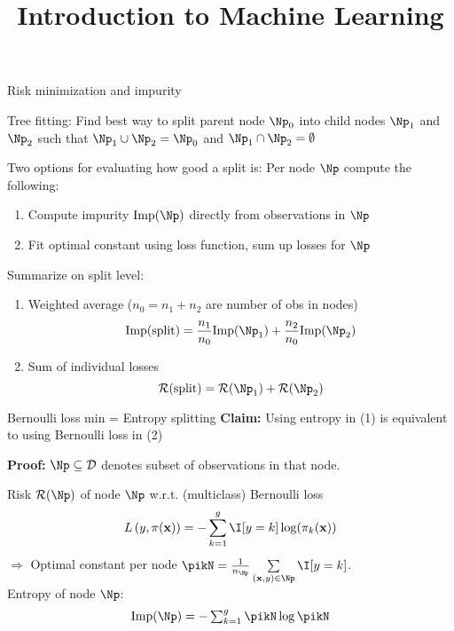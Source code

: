 \documentclass[11pt,compress,t,notes=noshow, xcolor=table]{beamer}
\title{Introduction to Machine Learning}
\begin{document}
    

\begin{framei}[sep=M]{Risk minimization and impurity}

\item Tree fitting: Find best way to split parent node $\Np_0$ into child nodes $\Np_1$ and $\Np_2$ such that $\Np_1 \cup \Np_2 = \Np_0$ and $\Np_1 \cap \Np_2 = \emptyset$
\item Two options for evaluating how good a split is: Per node $\Np$ compute the following:
\begin{enumerate}
\item Compute impurity $\text{Imp}(\Np)$ directly from observations in $\Np$
\item Fit optimal constant using loss function, sum up losses for $\Np$
\end{enumerate}
\item Summarize on split level:
\begin{enumerate}
\item Weighted average ($n_0 = n_1 + n_2$ are number of obs in nodes)
$$\text{Imp(split)} = \frac{n_1}{n_0} \text{Imp}(\Np_1) + \frac{n_2}{n_0} \text{Imp}(\Np_2)$$
\item Sum of individual losses
$$\risk(\text{split}) = \risk(\Np_1) + \risk(\Np_2)$$
\end{enumerate}

\end{framei}

\begin{frame}{Bernoulli loss min = Entropy splitting}
\textbf{Claim:} Using entropy in (1) 
is equivalent to using Bernoulli loss in (2) %

\vfill

\textbf{Proof:} %
$\Np \subseteq \D$ denotes subset of observations in that node. 

Risk $\risk(\Np)$ of node $\Np$ w.r.t. (multiclass) Bernoulli loss  
$$
\Lpixy = -\sum_{k = 1}^g \I [y=k] \log (\pi_k(\xv))
$$
$\Rightarrow$ Optimal constant per node $\pikN = \frac{1}{n_{\Np}} \sum\limits_{(\xv,y) \in \Np} \I [y=k]$.\\

Entropy of node $\Np$:
$$
\text{Imp}(\Np) = -\textstyle\sum_{k = 1}^g \pikN \log \pikN %
$$

\end{frame}
\end{document}
